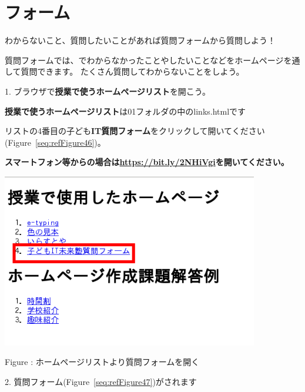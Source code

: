 \documentclass[a4paper,12pt]{jarticle}
\begin{document}
\section{フォーム}
わからないこと、質問したいことがあれば質問フォームから質問しよう！

質問フォームでは、でわからなかったことやしたいことなどをホームページを通して質問できます。
たくさん質問してわからないことをしよう。

1.
ブラウザで\textbf{授業で使うホームページリスト}を開こう。

\textbf{授業で使うホームページリスト}は01フォルダの中のlinks.htmlです

リストの4番目の子ども\textbf{IT質問フォーム}をクリックして開いてください(Figure~\ref{seq:refFigure46})。


\bigskip

{\bfseries
  スマートフォン等からの場合は\url{https://bit.ly/2NHiVgi}を開いてください。}



\centering
\begin{minipage}{9.781cm}
  {\upshape
    \includegraphics[width=11.231cm,height=7.613cm]{textbook-img245.png}
    \flushleft

    \bigskip
    Figure {\theFigure\label{seq:refFigure46}}:
    ホームページリストより質問フォームを開く}
\end{minipage}

\bigskip

\bigskip

2.
質問フォーム(Figure~\ref{seq:refFigure47})がされます
\end{document}
